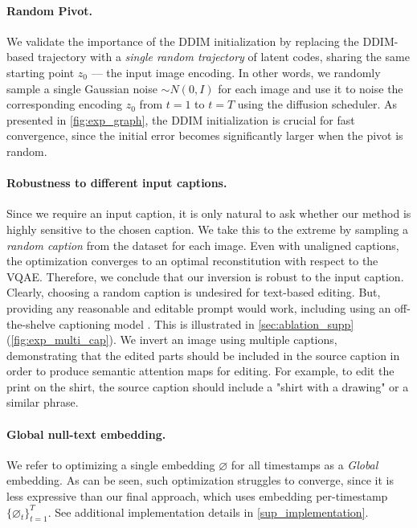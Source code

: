 \vspace{-0.4cm}
\paragraph{Random Pivot.}
We validate the importance of the DDIM initialization by replacing the DDIM-based trajectory with a \textit{single random trajectory} of latent codes, sharing the same starting point $z_0$ --- the input image encoding. In other words, we randomly sample a single Gaussian noise $\sim N(0, I)$ for each image and use it to noise the corresponding encoding $z_0$ from $t=1$ to $t=T$ using the diffusion scheduler. As presented in \cref{fig:exp_graph}, the DDIM initialization is crucial for fast convergence, since the initial error becomes significantly larger when the pivot is random. 




\vspace{-0.4cm}
\paragraph{Robustness to different input captions.}
Since we require an input caption, it is only natural to ask whether our method is highly sensitive to the chosen caption. We take this to the extreme by sampling a \textit{random caption} from the dataset for each image. Even with unaligned captions, the optimization converges to an optimal reconstitution with respect to the VQAE. Therefore, we conclude that our inversion is robust to the input caption. Clearly, choosing a random caption is undesired for text-based editing. But, providing any reasonable and editable prompt would work, including using an off-the-shelve captioning model \cite{mokady2021clipcap, stefanini2022show}. This is illustrated in \cref{sec:ablation_supp} (\cref{fig:exp_multi_cap}). We invert an image using multiple captions, demonstrating that the edited parts should be included in the source caption in order to produce semantic attention maps for editing. For example, to edit the print on the shirt, the source caption should include a "shirt with a drawing" or a similar phrase.


\vspace{-0.4cm}
\paragraph{Global null-text embedding.}
We refer to optimizing a single embedding $\varnothing$ for all timestamps as a \textit{Global} embedding. As can be seen, such optimization struggles to converge, since it is less expressive than our final approach, which uses embedding per-timestamp $\{\varnothing_t\}_{t=1}^{T}$. See additional implementation details in \cref{sup_implementation}.



